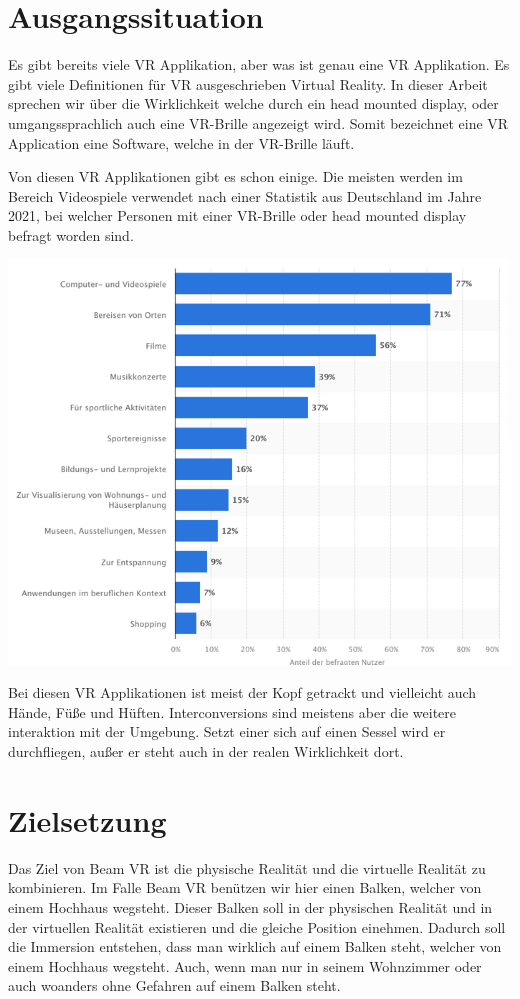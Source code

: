 \section{Ausgangssituation}\label{sec: initial_situation}

Es gibt bereits viele VR Applikation, aber was ist genau eine VR Applikation.
Es gibt viele Definitionen für VR ausgeschrieben Virtual Reality.
In dieser Arbeit sprechen wir über die Wirklichkeit welche durch ein head mounted display, oder umgangssprachlich auch eine VR-Brille angezeigt wird.
Somit bezeichnet eine VR Application eine Software, welche in der VR-Brille läuft.

Von diesen VR Applikationen gibt es schon einige.
Die meisten werden im Bereich Videospiele verwendet nach einer Statistik aus Deutschland im Jahre 2021, bei welcher Personen mit einer VR-Brille oder head mounted display befragt worden sind.

\includegraphics[scale=0.5]{pics/statistic_anwendungsgebiete_vr}

Bei diesen VR Applikationen ist meist der Kopf getrackt und vielleicht auch Hände, Füße und Hüften.
Interconversions sind meistens aber die weitere interaktion mit der Umgebung.
Setzt einer sich auf einen Sessel wird er durchfliegen, außer er steht auch in der realen Wirklichkeit dort.

\section{Zielsetzung}\label{sec: objective}

Das Ziel von Beam VR ist die physische Realität und die virtuelle Realität zu kombinieren.
Im Falle Beam VR benützen wir hier einen Balken, welcher von einem Hochhaus wegsteht.
Dieser Balken soll in der physischen Realität und in der virtuellen Realität existieren und die gleiche Position einehmen.
Dadurch soll die Immersion entstehen, dass man wirklich auf einem Balken steht, welcher von einem Hochhaus wegsteht.
Auch, wenn man nur in seinem Wohnzimmer oder auch woanders ohne Gefahren auf einem Balken steht.
